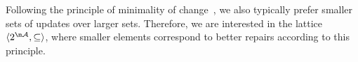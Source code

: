 

% 
% 
% 

Following the principle of minimality of change~\cite{Winslett90,ai/EiterG92}, we also typically prefer smaller sets of updates over larger sets.
Therefore, we are interested in the lattice $\langle 2^{\acts},\subseteq\rangle$, where smaller elements correspond to better repairs according to this principle.


